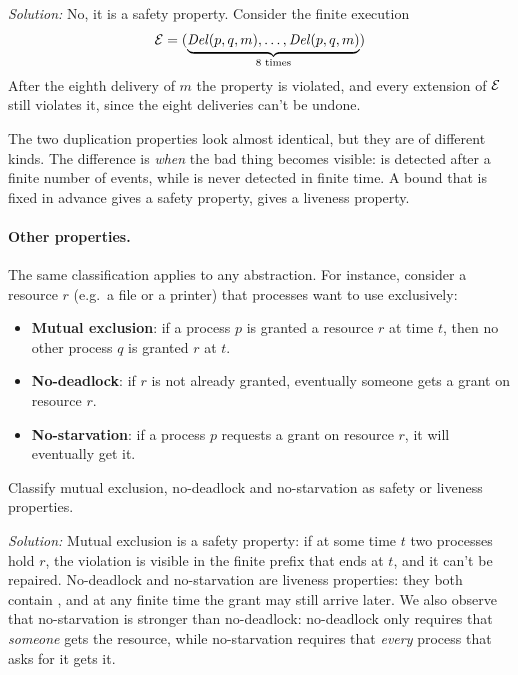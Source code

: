 \textit{Solution:} No, it is a safety property. Consider the finite execution
\[\mathcal{E} = (\underbrace{\mathit{Del}(p,q,m), \ldots, \mathit{Del}(p,q,m)}_{8 \text{ times}})\]
After the eighth delivery of $m$ the property is violated, and every extension of $\mathcal{E}$ still violates it, since the eight deliveries can't be undone.

\begin{framedobs}{}
  The two duplication properties look almost identical, but they are of different kinds. The difference is \textit{when} the bad thing becomes visible:  is detected after a finite number of events, while  is never detected in finite time. A bound that is fixed in advance gives a safety property,  gives a liveness property.
\end{framedobs}

\paragraph{Other properties.} The same classification applies to any abstraction. For instance, consider a resource $r$ (e.g.\ a file or a printer) that processes want to use exclusively:
\begin{itemize}
  \item \textbf{Mutual exclusion}: if a process $p$ is granted a resource $r$ at time $t$, then no other process $q$ is granted $r$ at $t$.
  \item \textbf{No-deadlock}: if $r$ is not already granted, eventually someone gets a grant on resource $r$.
  \item \textbf{No-starvation}: if a process $p$ requests a grant on resource $r$, it will eventually get it.
\end{itemize}

\begin{framedprob}{}
  Classify mutual exclusion, no-deadlock and no-starvation as safety or liveness properties.
\end{framedprob}

\textit{Solution:} Mutual exclusion is a safety property: if at some time $t$ two processes hold $r$, the violation is visible in the finite prefix that ends at $t$, and it can't be repaired. No-deadlock and no-starvation are liveness properties: they both contain , and at any finite time the grant may still arrive later. We also observe that no-starvation is stronger than no-deadlock: no-deadlock only requires that \textit{someone} gets the resource, while no-starvation requires that \textit{every} process that asks for it gets it.

